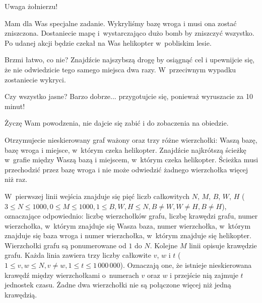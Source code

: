 

\usepackage[utf8]{inputenc}
\usepackage[T1]{fontenc}
\usepackage[polish]{babel}
\usepackage{polski}





\noindent
Uwaga żołnierzu!

\bigskip \noindent
Mam dla Was specjalne zadanie.
Wykryliśmy bazę wroga i musi ona zostać zniszczona.
Dostaniecie mapę i~wystarczająco dużo bomb by zniszczyć wszystko.
Po udanej akcji będzie czekał na Was helikopter w~pobliskim lesie.

\bigskip \noindent
Brzmi łatwo, co nie?
Znajdźcie najszybszą drogę by osiągnąć cel i upewnijcie się, że nie odwiedzicie tego samego miejsca dwa razy.
W~przeciwnym wypadku zostaniecie wykryci.

\bigskip \noindent
Czy wszystko jasne?
Barzo dobrze... przygotujcie się, ponieważ wyruszacie za 10 minut!

\bigskip \noindent
Życzę Wam powodzenia, nie dajcie się zabić i do zobaczenia na obiedzie.


Otrzymujecie nieskierowany graf ważony oraz trzy różne wierzchołki:
	Waszą bazę, bazę wroga i miejsce, w~którym czeka helikopter.
Znajdźcie najkrótszą ścieżkę w~grafie między Waszą bazą i miejscem, w~którym czeka helikopter.
Ścieżka musi przechodzić przez bazę wroga i nie może odwiedzić żadnego wierzchołka więcej niż raz.


W~pierwszej linii wejścia znajduje się pięć liczb całkowitych $N$, $M$, $B$, $W$, $H$
	($3 \le N \le 1000, 0 \le M \le 1000, 1 \le B,W,H \le N, B \neq W, W \neq H, B \neq H$),
	oznaczające odpowiednio: liczbę wierzchołków grafu,
	liczbę krawędzi grafu,
	numer wierzchołka, w~którym znajduje się Wasza baza,
	numer wierzchołka, w~którym znajduje się baza wroga
	i numer wierzchołka, w~którym znajduje się helikopter.
Wierzchołki grafu są ponumerowane od $1$ do $N$.
Kolejne $M$ linii opisuje krawędzie grafu.
Każda linia zawiera trzy liczby całkowite $v$, $w$ i $t$
	($1 \le v,w \le N, v \neq w, 1 \le t \le 1\,000\,000$).
Oznaczają one, że istnieje nieskierowana krawędź między wierzchołkami
	o~numerach $v$ oraz $w$ i przejście nią zajmuje $t$ jednostek czasu.
Żadne dwa wierzchołki nie są połączone więcej niż jedną krawędzią.

